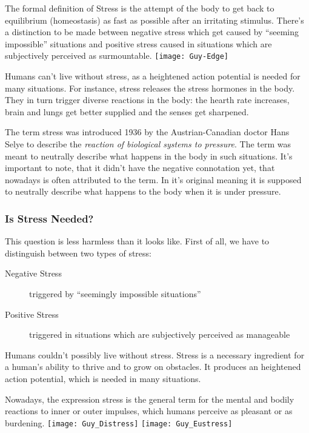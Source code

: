 \documentclass[../main.tex]{subfiles}
\begin{document}
The formal definition of Stress is the attempt of the body to get back to equilibrium (homeostasis) as fast as possible after an irritating stimulus.
There's a distinction to be made between negative stress which get caused by ``seeming impossible''
 situations and positive stress caused in situations which are subjectively perceived as surmountable.
\texttt{[image: Guy-Edge]}\label{sf:edge}

Humans can't live without stress, as a heightened action potential is needed for many situations.
For instance, stress releases the stress hormones in the body.
They in turn trigger diverse reactions in the body: the hearth rate increases, brain and lungs get better supplied and the senses get sharpened.

The term stress was introduced 1936 by the Austrian-Canadian doctor Hans Selye to describe the \emph{reaction of biological systems to pressure}. The term was meant to neutrally describe what happens in the body in such situations.
It's important to note, that it didn't have the negative connotation yet, that nowadays is often attributed to the term.
In it's original meaning it is supposed to neutrally describe what happens to the body when it is under pressure.

\subsubsection{Is Stress Needed?}

This question is less harmless than it looks like.
First of all, we have to distinguish between two types of stress:
	\begin{description}
		\item[Negative Stress] triggered by ``seemingly impossible situations''
		\item[Positive Stress] triggered in situations which are subjectively perceived as manageable
	\end{description}
	
        Humans couldn't possibly live without stress.
        Stress is a necessary ingredient for a human's ability to thrive and to grow on obstacles.
        It produces an heightened action potential, which is needed in many situations.

Nowadays, the expression stress is the general term for the mental and bodily reactions to inner or outer impulses, which humans perceive as pleasant or as burdening.
\texttt{[image: Guy\_Distress]}
\hspace{5cm}
\texttt{[image: Guy\_Eustress]}\label{sf:eustress}
\end{document}

